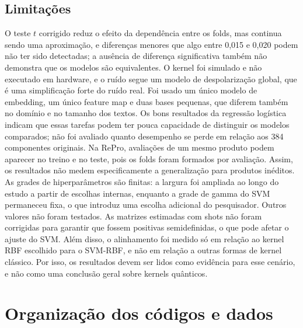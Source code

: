 \documentclass[conference]{IEEEtran}
\newcommand{\svm}{\mbox{SVM-RBF}}
\begin{document}
\subsection{Limitações}
O teste $t$ corrigido reduz o efeito da dependência entre os folds, mas continua sendo uma aproximação, e diferenças menores que algo entre 0,015 e 0,020 podem não ter sido detectadas; a ausência de diferença significativa também não demonstra que os modelos são equivalentes. O kernel foi simulado e não executado em hardware, e o ruído segue um modelo de despolarização global, que é uma simplificação forte do ruído real. Foi usado um único modelo de embedding, um único feature map e duas bases pequenas, que diferem também no domínio e no tamanho dos textos. Os bons resultados da regressão logística indicam que essas tarefas podem ter pouca capacidade de distinguir os modelos comparados; não foi avaliado quanto desempenho se perde em relação aos 384 componentes originais. Na RePro, avaliações de um mesmo produto podem aparecer no treino e no teste, pois os folds foram formados por avaliação. Assim, os resultados não medem especificamente a generalização para produtos inéditos. As grades de hiperparâmetros são finitas: a largura foi ampliada ao longo do estudo a partir de escolhas internas, enquanto a grade de gamma do SVM permaneceu fixa, o que introduz uma escolha adicional do pesquisador. Outros valores não foram testados. As matrizes estimadas com shots não foram corrigidas para garantir que fossem positivas semidefinidas, o que pode afetar o ajuste do SVM. Além disso, o alinhamento foi medido só em relação ao kernel RBF escolhido para o \svm{}, e não em relação a outras formas de kernel clássico. Por isso, os resultados devem ser lidos como evidência para esse cenário, e não como uma conclusão geral sobre kernels quânticos.

\section{Organização dos códigos e dados}
\label{sec:codigo}
\end{document}
